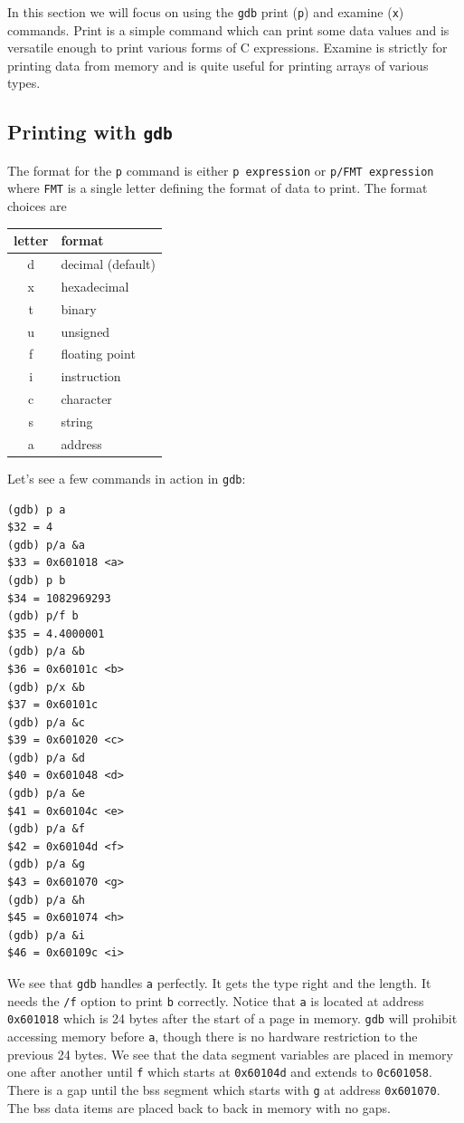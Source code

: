 \documentclass[11pt,b5paper]{book}
\begin{document}
In this section we will focus on using the {\tt gdb} print ({\tt p}) and examine ({\tt x}) commands.
Print is a simple command which can print some data values and is versatile enough to print various forms of C expressions.
Examine is strictly for printing data from memory and is quite useful for
printing arrays of various types.

\subsection{Printing with {\tt gdb}}

The format for the {\tt p} command is either {\tt p expression} or 
{\tt p/FMT expression} where {\tt FMT} is a single letter defining the
format of data to print.
The format choices are
\begin{center}
\begin{tabular}{|c|l|}
\hline
letter & format \\
\hline
d      & decimal (default) \\
\hline
x 		& hexadecimal \\
\hline
t     & binary \\
\hline
u     & unsigned \\
\hline
f     & floating point \\
\hline
i     & instruction \\
\hline
c     & character \\
\hline
s     & string \\
\hline
a     & address \\
\hline
\end{tabular}
\end{center}

Let's see a few commands in action in {\tt gdb}:
\begin{verbatim}
(gdb) p a
$32 = 4
(gdb) p/a &a
$33 = 0x601018 <a>
(gdb) p b
$34 = 1082969293
(gdb) p/f b
$35 = 4.4000001
(gdb) p/a &b
$36 = 0x60101c <b>
(gdb) p/x &b
$37 = 0x60101c
(gdb) p/a &c
$39 = 0x601020 <c>
(gdb) p/a &d
$40 = 0x601048 <d>
(gdb) p/a &e
$41 = 0x60104c <e>
(gdb) p/a &f
$42 = 0x60104d <f>
(gdb) p/a &g
$43 = 0x601070 <g>
(gdb) p/a &h
$45 = 0x601074 <h>
(gdb) p/a &i
$46 = 0x60109c <i>

\end{verbatim}

We see that {\tt gdb} handles {\tt a} perfectly.
It gets the type right and the length.
It needs the {\tt /f} option to print {\tt b} correctly.
Notice that {\tt a} is located at address {\tt 0x601018} which is 24 bytes
after the start of a page in memory.
{\tt gdb} will prohibit accessing memory before {\tt a}, though there is
no hardware restriction to the previous 24 bytes.
We see that the data segment variables are placed in memory one after another until {\tt f} which starts at {\tt 0x60104d} and extends to
{\tt 0c601058}.
There is a gap until the bss segment which starts with {\tt g} at
address {\tt 0x601070}.
The bss data items are placed back to back in memory with no gaps.
\end{document}
